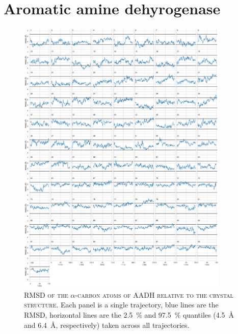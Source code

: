 \chapter{Aromatic amine dehyrogenase}\label{app:aadh}


\begin{figure}[ph!]
 \centering
 \includegraphics[width=0.9\textwidth]{chapters/aadh/figures/rmsd_backbone_ca.pdf}
 \caption[RMSD of the alpha-carbon atoms of AADH relative to the crystal structure]{\textsc{RMSD of the $\alpha$-carbon atoms of AADH relative to the crystal structure}. Each panel is a single trajectory, blue lines are the RMSD, horizontal lines are the \SI{2.5}{\percent} and \SI{97.5}{\percent} quantiles (\SI{4.5}{\angstrom} and \SI{6.4}{\angstrom}, respectively) taken across all trajectories.}
 \label{fig:rmsd_ca}
\end{figure}

